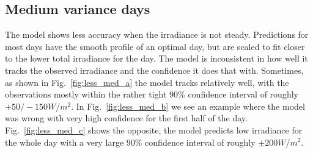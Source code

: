 \subsection{Medium variance days}
The model shows less accuracy when the irradiance is not steady. Predictions for most days have the smooth profile of an optimal day, but are scaled to fit closer to the lower total irradiance for the day. The model is inconsistent in how well it tracks the observed irradiance and the confidence it does that with. Sometimes, as shown in Fig.~\ref{fig:less_med_a} the model tracks relatively well, with the observations mostly within the rather tight 90\% confidence interval of roughly $+50/-150 W/m^2$. In Fig.~\ref{fig:less_med_b} we see an example where the model was wrong with very high confidence for the first half of the day. Fig.~\ref{fig:less_med_c} shows the opposite, the model predicts low irradiance for the whole day with a very large 90\% confidence interval of roughly $\pm200 W/m^2$.
